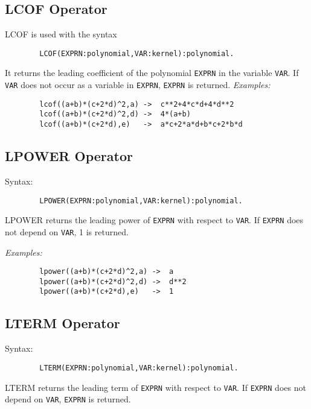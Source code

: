 \subsection{LCOF Operator}
\hypertarget{operator:LCOF}{}

LCOF is used with the syntax
\begin{verbatim}
        LCOF(EXPRN:polynomial,VAR:kernel):polynomial.
\end{verbatim}
It returns the leading coefficient of the
polynomial \texttt{EXPRN} in the variable \texttt{VAR}.  If \texttt{VAR} does not
occur as a variable in \texttt{EXPRN}, \texttt{EXPRN} is returned.
\textit{Examples:}
\begin{verbatim}
        lcof((a+b)*(c+2*d)^2,a) ->  c**2+4*c*d+4*d**2
        lcof((a+b)*(c+2*d)^2,d) ->  4*(a+b)
        lcof((a+b)*(c+2*d),e)   ->  a*c+2*a*d+b*c+2*b*d
\end{verbatim}

\subsection{LPOWER Operator}
\hypertarget{operator:LPOWER}{}

Syntax:
\begin{verbatim}
        LPOWER(EXPRN:polynomial,VAR:kernel):polynomial.
\end{verbatim}
LPOWER returns the leading power of \texttt{EXPRN} with respect to \texttt{VAR}.
If \texttt{EXPRN} does not depend on \texttt{VAR}, 1 is returned.

\textit{Examples:}
\begin{verbatim}
        lpower((a+b)*(c+2*d)^2,a) ->  a
        lpower((a+b)*(c+2*d)^2,d) ->  d**2
        lpower((a+b)*(c+2*d),e)   ->  1
\end{verbatim}

\subsection{LTERM Operator}
\hypertarget{operator:LTERM}{}

\begin{samepage}
Syntax:
\begin{verbatim}
        LTERM(EXPRN:polynomial,VAR:kernel):polynomial.
\end{verbatim}
LTERM returns the leading term of \texttt{EXPRN} with respect to \texttt{VAR}.
If \texttt{EXPRN} does not depend on \texttt{VAR}, \texttt{EXPRN} is returned.
\end{samepage}

